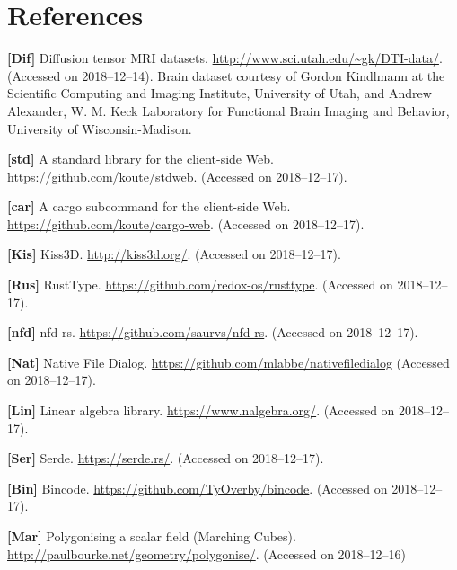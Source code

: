 \documentclass{article}
\begin{document}
\section*{References}

\textbf{[Dif]}\label{ref:Dif}
Diffusion tensor MRI datasets. \url{http://www.sci.utah.edu/~gk/DTI-data/}. (Accessed on 2018--12--14). Brain dataset courtesy of Gordon Kindlmann at the Scientific Computing and Imaging Institute, University of Utah, and Andrew Alexander, W. M. Keck Laboratory for Functional Brain Imaging and Behavior, University of Wisconsin-Madison.

\textbf{[std]}\label{ref:std}
A standard library for the client-side Web. \url{https://github.com/koute/stdweb}. (Accessed on 2018--12--17).

\textbf{[car]}\label{ref:car}
A cargo subcommand for the client-side Web. \url{https://github.com/koute/cargo-web}. (Accessed on 2018--12--17).

\textbf{[Kis]}\label{ref:Kis}
Kiss3D. \url{http://kiss3d.org/}. (Accessed on 2018--12--17).

\textbf{[Rus]}\label{ref:Rus}
RustType. \url{https://github.com/redox-os/rusttype}. (Accessed on 2018--12--17).

\textbf{[nfd]}\label{ref:nfd}
nfd-rs. \url{https://github.com/saurvs/nfd-rs}. (Accessed on 2018--12--17).

\textbf{[Nat]}\label{ref:Nat}
Native File Dialog. \url{https://github.com/mlabbe/nativefiledialog} (Accessed on 2018--12--17).

\textbf{[Lin]}\label{ref:Lin}
Linear algebra library. \url{https://www.nalgebra.org/}. (Accessed on 2018--12--17).

\textbf{[Ser]}\label{ref:Ser}
Serde. \url{https://serde.rs/}. (Accessed on 2018--12--17).

\textbf{[Bin]}\label{ref:Bin}
Bincode. \url{https://github.com/TyOverby/bincode}. (Accessed on 2018--12--17).

\textbf{[Mar]}\label{ref:Mar}
Polygonising a scalar field (Marching Cubes). \url{http://paulbourke.net/geometry/polygonise/}. (Accessed on 2018--12--16)
\end{document}
